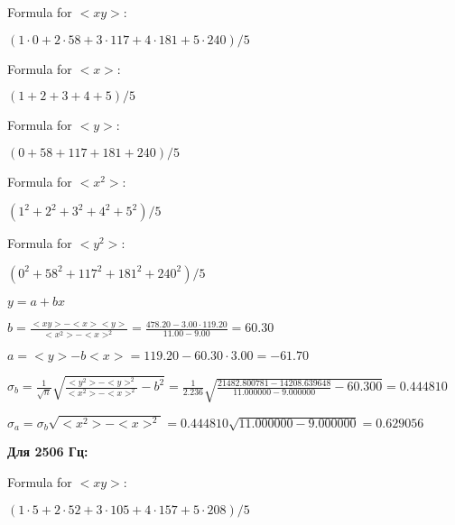 \documentclass[12pt,a4paper]{article}
\begin{document}
Formula for $<xy>:$
\vspace{0.5cm}

$(1 \cdot 0 + 2 \cdot 58 + 3 \cdot 117 + 4 \cdot 181 + 5 \cdot 240) / 5$
\vspace{0.5cm}

Formula for $<x>:$
\vspace{0.5cm}

$(1 + 2 + 3 + 4 + 5) / 5$
\vspace{0.5cm}

Formula for $<y>:$
\vspace{0.5cm}

$(0 + 58 + 117 + 181 + 240) / 5$
\vspace{0.5cm}

Formula for $<x^2>$:
\vspace{0.5cm}

$(1^2 + 2^2 + 3^2 + 4^2 + 5^2) / 5$
\vspace{0.5cm}

Formula for $<y^2>:$
\vspace{0.5cm}

$(0^2 + 58^2 + 117^2 + 181^2 + 240^2) / 5$
\vspace{0.5cm}



$y = a + bx$
\vspace{0.5cm}

$b = \frac{<xy> - <x><y>}{<x^2> - <x>^2} = \frac{478.20 - 3.00 \cdot 119.20}{11.00 - 9.00} = 60.30$
\vspace{0.5cm}

$a =<y> - b<x> = 119.20 - 60.30 \cdot 3.00 = -61.70$
\vspace{0.5cm}

$\sigma_b = \frac{1}{\sqrt{n}} \sqrt { \frac{<y^2> - <y>^2}{<x^2> - <x>^2}  - b^2} = \frac{1}{2.236} \sqrt {\frac{21482.800781 - 14208.639648}{11.000000 - 9.000000} - 60.300} = 0.444810$
\vspace{0.5cm}

$\sigma_a = \sigma_b \sqrt{<x^2> - <x>^2} = 0.444810 \sqrt{11.000000 - 9.000000} = 0.629056$

\vspace{0.5cm}

\textbf{Для 2506 Гц:}
\vspace{0.5cm}

Formula for $<xy>:$
\vspace{0.5cm}

$(1 \cdot 5 + 2 \cdot 52 + 3 \cdot 105 + 4 \cdot 157 + 5 \cdot 208) / 5$
\vspace{0.5cm}
\end{document}
